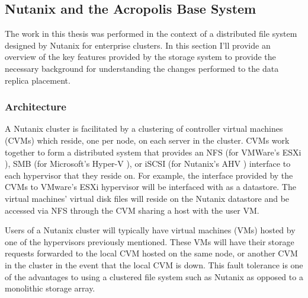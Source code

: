 \documentclass[12pt]{article}
\begin{document}
  \subsection{Nutanix and the Acropolis Base System} \label{sssec:abs}

  The work in this thesis was performed in the context of a distributed
  file system designed by Nutanix for enterprise clusters. In this section I'll
  provide an overview of the key features provided by the storage system to
  provide the necessary background for understanding the changes performed to
  the data replica placement.

    \subsubsection{Architecture}

    A Nutanix cluster is facilitated by a clustering of controller virtual
    machines (CVMs) which reside, one per node, on each server in the cluster.
    CVMs work together to form a distributed system that provides an NFS (for
    VMWare's ESXi \cite{esxi2008}), SMB (for Microsoft's Hyper-V
    \cite{hyperv2009}), or iSCSI (for Nutanix's AHV \cite{bible}) interface to
    each hypervisor that they reside on. For example, the interface provided by
    the CVMs to VMware's ESXi hypervisor will be interfaced with as a
    datastore. The virtual machines' virtual disk files will reside on the
    Nutanix datastore and be accessed via NFS through the CVM sharing a host
    with the user VM.

    Users of a Nutanix cluster will typically have virtual machines (VMs)
    hosted by one of the hypervisors previously mentioned. These VMs will have
    their storage requests forwarded to the local CVM hosted on the same node,
    or another CVM in the cluster in the event that the local CVM is down. This
    fault tolerance is one of the advantages to using a clustered file system
    such as Nutanix as opposed to a monolithic storage array.
    
\end{document}
